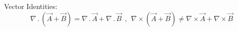 Vector Identities:
$$ \nabla \,.\, ( \vec{A} +  \vec{B} ) = \nabla \,.\, \vec{A} +  \nabla \,.\,  \vec{B}  ~~ , ~~\nabla \times ( \vec{A} +  \vec{B} ) \neq \nabla \times \vec{A} +  \nabla \times  \vec{B} $$
~\par
\begin{minipage}[b]{.49\textwidth}
\lipsum[1]
\end{minipage}%
\hspace{.02\textwidth}
\begin{minipage}[b]{.49\textwidth}
\lipsum[1]
\end{minipage}%
\par
\setlength{\parindent}{0.0cm} %
